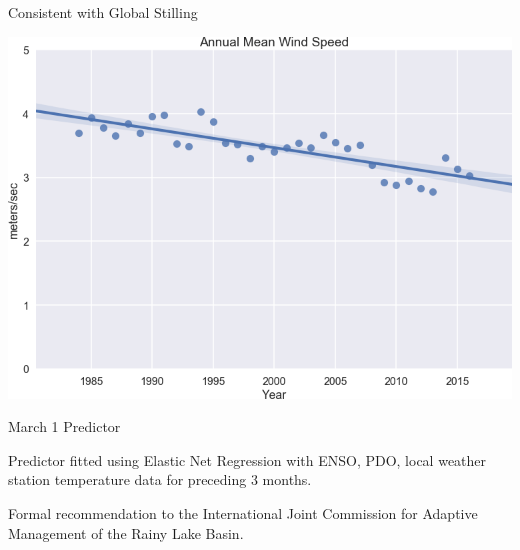 \documentclass[compress,english]{beamer}
\begin{document}
\begin{frame}{Consistent with Global Stilling}

\begin{center}
\includegraphics[width=0.8\paperwidth]{WindTrendLine.png}
\end{center}

\end{frame}

\begin{frame}{March 1 Predictor}

\begin{center}
\end{center}

Predictor fitted using Elastic Net Regression with ENSO, PDO,
local weather station temperature data for preceding 3 months.

Formal recommendation to the International Joint Commission for Adaptive Management of the Rainy Lake Basin.

\end{frame}


\end{document}
